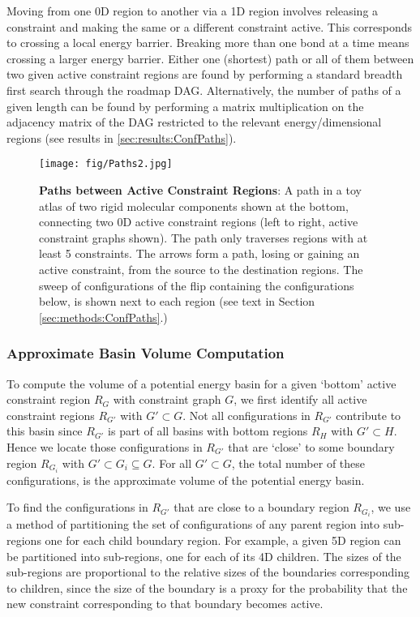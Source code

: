 \documentclass[]{article}
\newcommand{\rmc}{rigid molecular component}
\begin{document}
Moving from one 0D region to another via a 1D region involves releasing a
constraint and making the same or a different constraint active. This
corresponds to crossing a local energy barrier. Breaking more than one bond at
a time means crossing a larger energy barrier. Either one (shortest) path or
all of them between two given active constraint regions are found by performing
a standard breadth first search through the roadmap DAG. Alternatively, the
number of paths of a given length can be found by performing a matrix
multiplication on the adjacency matrix of the DAG restricted to the relevant
energy/dimensional regions (see results in \ref{sec:results:ConfPaths}).

\begin{figure}[htpb]
\centering
\texttt{[image: fig/Paths2.jpg]}
\caption{\scriptsize \textbf{Paths between Active Constraint Regions}: A path 
in a toy atlas of two \rmc s shown at the bottom, connecting two 0D active 
constraint regions (left to right, active constraint graphs shown). 
The path only traverses regions with at least 5 constraints.
The arrows form a path, losing or gaining an active constraint, from the source 
to the destination regions. The sweep of configurations of the flip containing 
the configurations below, is shown next to each region (see text in Section 
\ref{sec:methods:ConfPaths}.)}
\label{fig:paths}
\end{figure}

\subsubsection{Approximate Basin Volume Computation}
\label{sec:methods:approximateVolume}
To compute the volume of a potential energy basin for a given `bottom'
active constraint region $R_G$ with constraint graph $G$, we first identify all
active constraint regions $R_{G'}$ with $G' \subset G$. Not all configurations
in $R_{G'}$ contribute to this basin since $R_{G'}$ is part of all basins with
bottom regions $R_H$ with $G' \subset H$. Hence we locate those configurations
in $R_{G'}$ that are `close' to some boundary region $R_{G_i}$ with $G'
\subset G_i \subseteq G$.  For all $G' \subset G$, the total number of these
configurations, is the approximate volume of the potential energy basin.

To find the configurations in $R_{G'}$ that are close to a boundary region
$R_{G_i}$, we use a method of partitioning the set of configurations of any
parent region into sub-regions one for each child boundary region.  For
example, a given 5D region can be partitioned into sub-regions, one for each of
its 4D children.  The sizes of the sub-regions are proportional to the relative
sizes of the boundaries corresponding to children, since the size of the
boundary is a proxy for the probability that the new constraint corresponding
to that boundary becomes active. 
\end{document}
